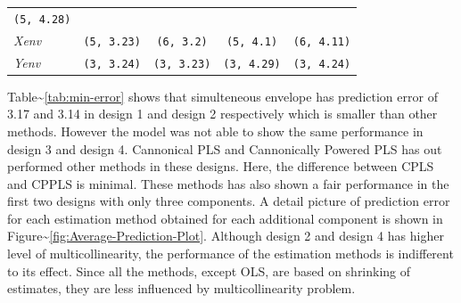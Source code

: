 \documentclass[12pt,A4paper,authoryear]{elsarticle} %
\theoremstyle{definition}
\theoremstyle{definition}
\theoremstyle{remark}
\begin{document}
\begin{longtable}[]{@{}lcccc@{}}
\begin{minipage}[t]{0.19\columnwidth}
\texttt{(5,\ 4.28)}\strut
\end{minipage}\tabularnewline
\begin{minipage}[t]{0.09\columnwidth}\raggedright\strut
\emph{Xenv}\strut
\end{minipage} & \begin{minipage}[t]{0.19\columnwidth}\centering\strut
\texttt{(5,\ 3.23)}\strut
\end{minipage} & \begin{minipage}[t]{0.19\columnwidth}\centering\strut
\texttt{(6,\ 3.2)}\strut
\end{minipage} & \begin{minipage}[t]{0.19\columnwidth}\centering\strut
\texttt{(5,\ 4.1)}\strut
\end{minipage} & \begin{minipage}[t]{0.19\columnwidth}\centering\strut
\texttt{(6,\ 4.11)}\strut
\end{minipage}\tabularnewline
\begin{minipage}[t]{0.09\columnwidth}\raggedright\strut
\emph{Yenv}\strut
\end{minipage} & \begin{minipage}[t]{0.19\columnwidth}\centering\strut
\texttt{(3,\ 3.24)}\strut
\end{minipage} & \begin{minipage}[t]{0.19\columnwidth}\centering\strut
\texttt{(3,\ 3.23)}\strut
\end{minipage} & \begin{minipage}[t]{0.19\columnwidth}\centering\strut
\texttt{(3,\ 4.29)}\strut
\end{minipage} & \begin{minipage}[t]{0.19\columnwidth}\centering\strut
\texttt{(3,\ 4.24)}\strut
\end{minipage}\tabularnewline
\bottomrule
\end{longtable}

Table\textasciitilde{}\ref{tab:min-error} shows that simulteneous
envelope has prediction error of 3.17 and 3.14 in design 1 and design 2
respectively which is smaller than other methods. However the model was
not able to show the same performance in design 3 and design 4.
Cannonical PLS and Cannonically Powered PLS has out performed other
methods in these designs. Here, the difference between CPLS and CPPLS is
minimal. These methods has also shown a fair performance in the first
two designs with only three components. A detail picture of prediction
error for each estimation method obtained for each additional component
is shown in Figure\textasciitilde{}\ref{fig:Average-Prediction-Plot}.
Although design 2 and design 4 has higher level of multicollinearity,
the performance of the estimation methods is indifferent to its effect.
Since all the methods, except OLS, are based on shrinking of estimates,
they are less influenced by multicollinearity problem.
\end{document}
